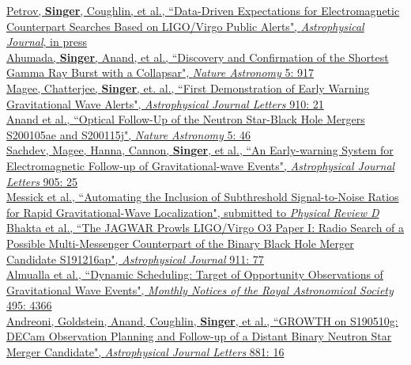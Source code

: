 \documentclass[10pt, letterpaper]{article} %
\newcommand{\years}[1]{\marginnote{\scriptsize #1}} %
\begin{document}
\years{2021}\href{https://ui.adsabs.harvard.edu/abs/2021arXiv210807277P/abstract}{Petrov, \textbf{Singer}, Coughlin, et al., “Data-Driven Expectations for Electromagnetic Counterpart Searches Based on LIGO/Virgo Public Alerts", \emph{Astrophysical Journal}, in press}\\[0.125cm]
%
\years{2021}\href{https://doi.org/10.1038/s41550-021-01428-7}{Ahumada, \textbf{Singer}, Anand, et al., “Discovery and Confirmation of the Shortest Gamma Ray Burst with a Collapsar", \emph{Nature Astronomy} 5: 917}\\[0.125cm]
%
\years{2021}\href{https://doi.org/10.3847/2041-8213/abed54}{Magee, Chatterjee, \textbf{Singer}, et. al., “First Demonstration of Early Warning Gravitational Wave Alerts", \emph{Astrophysical Journal Letters} 910: 21}\\[0.125cm]
%
\years{2021}\href{https://doi.org/10.1038/s41550-020-1183-3}{Anand et al., “Optical Follow-Up of the Neutron Star-Black Hole Mergers S200105ae and S200115j", \emph{Nature Astronomy} 5: 46}\\[0.125cm]
%
\years{2020}\href{https://doi.org/10.3847/2041-8213/abc753}{Sachdev, Magee, Hanna, Cannon, \textbf{Singer}, et al., “An Early-warning System for Electromagnetic Follow-up of Gravitational-wave Events", \emph{Astrophysical Journal Letters} 905: 25}\\[0.125cm]
%
\years{2020}\href{https://arxiv.org/abs/2011.02457}{Messick et al., “Automating the Inclusion of Subthreshold Signal-to-Noise Ratios for Rapid Gravitational-Wave Localization", submitted to \emph{Physical Review D}}\\[0.125cm]
%
\years{2020}\href{https://doi.org/10.3847/1538-4357/abeaa8}{Bhakta et al., “The JAGWAR Prowls LIGO/Virgo O3 Paper I: Radio Search of a Possible Multi-Messenger Counterpart of the Binary Black Hole Merger Candidate S191216ap", \emph{Astrophysical Journal} 911: 77}\\[0.125cm]
%
\years{2020}\href{https://doi.org/10.1093/mnras/staa1498}{Almualla et al., “Dynamic Scheduling: Target of Opportunity Observations of Gravitational Wave Events", \emph{Monthly Notices of the Royal Astronomical Society} 495: 4366}\\[0.125cm]
%
\years{2019}\href{https://doi.org/10.3847/2041-8213/ab3399}{Andreoni, Goldstein, Anand, Coughlin, \textbf{Singer}, et al., “GROWTH on S190510g: DECam Observation Planning and Follow-up of a Distant Binary Neutron Star Merger Candidate", \emph{Astrophysical Journal Letters} 881: 16}\\[0.125cm]
\end{document}
